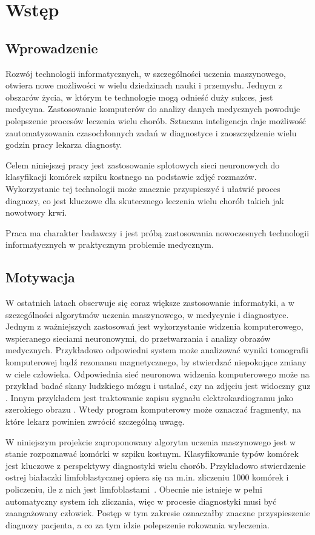 \chapter{Wstęp}


\section{Wprowadzenie}

Rozwój technologii informatycznych, w szczególności uczenia maszynowego, otwiera nowe możliwości w wielu dziedzinach nauki i przemysłu.
Jednym z obszarów życia, w którym te technologie mogą odnieść duży sukces, jest medycyna.
Zastosowanie komputerów do analizy danych medycznych powoduje polepszenie procesów leczenia wielu chorób.
Sztuczna inteligencja daje możliwość zautomatyzowania czasochłonnych zadań w diagnostyce i zaoszczędzenie wielu godzin pracy lekarza diagnosty.

Celem niniejszej pracy jest zastosowanie splotowych sieci neuronowych do klasyfikacji komórek szpiku kostnego na podstawie zdjęć rozmazów.
Wykorzystanie tej technologii może znacznie przyspieszyć i ułatwić proces diagnozy, co jest kluczowe dla skutecznego leczenia wielu chorób takich jak nowotwory krwi.

Praca ma charakter badawczy i jest próbą zastosowania nowoczesnych technologii informatycznych w praktycznym problemie medycznym.


\section{Motywacja}

W ostatnich latach obserwuje się coraz większe zastosowanie informatyki, a w szczególności algorytmów uczenia maszynowego,
w medycynie i diagnostyce.
Jednym z ważniejszych zastosowań jest wykorzystanie widzenia komputerowego, wspieranego sieciami neuronowymi, do przetwarzania i analizy obrazów medycznych.
Przykładowo odpowiedni system może analizować wyniki tomografii komputerowej bądź rezonansu magnetycznego, by stwierdzać niepokojące zmiany w ciele człowieka.
Odpowiednia sieć neuronowa widzenia komputerowego może na przykład badać skany ludzkiego mózgu i ustalać, czy na zdjęciu jest widoczny guz \cite{brain_tumor}.
Innym przykładem jest traktowanie zapisu sygnału elektrokardiogramu jako szerokiego
obrazu \cite{ecg_cnn}.
Wtedy program komputerowy może oznaczać fragmenty, na które lekarz powinien zwrócić szczególną uwagę.

W niniejszym projekcie zaproponowany algorytm uczenia maszynowego jest w stanie rozpoznawać komórki w szpiku kostnym.
Klasyfikowanie typów komórek jest kluczowe z perspektywy diagnostyki wielu chorób.
Przykładowo stwierdzenie ostrej białaczki limfoblastycznej opiera się na m.in.
zliczeniu 1000 komórek i policzeniu, ile z nich jest limfoblastami~\cite{blast_counting_diagnosis}.
Obecnie nie istnieje w pełni automatyczny system ich zliczania, więc w procesie diagnostyki musi być zaangażowany człowiek.
Postęp w tym zakresie oznaczałby znaczne przyspieszenie diagnozy pacjenta, a co za tym idzie polepszenie rokowania wyleczenia.


